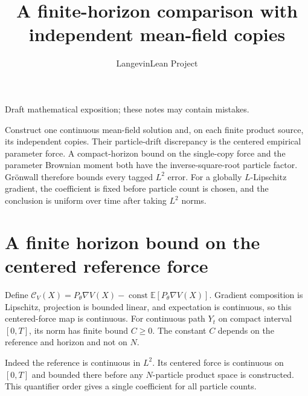 \documentclass[11pt,a4paper]{article}
\title{\texorpdfstring{A finite-horizon comparison with independent mean-field copies}{A finite-horizon comparison with independent mean-field copies}}
\author{LangevinLean Project}
\date{}
\begin{document}
\maketitle
Draft mathematical exposition; these notes may contain mistakes.


Construct one continuous mean-field solution and, on each finite product source, its independent copies. Their particle-drift discrepancy is the centered empirical parameter force. A compact-horizon bound on the single-copy force and the parameter Brownian moment both have the inverse-square-root particle factor. Grönwall therefore bounds every tagged \(L^2\) error. For a globally \(L\)-Lipschitz gradient, the coefficient is fixed before particle count is chosen, and the conclusion is uniform over time after taking \(L^2\) norms.


\section{\texorpdfstring{A finite horizon bound on the centered reference force}{A finite horizon bound on the centered reference force}}


Define \(\mathcal C_V(X)=P_\theta\nabla V(X)-\operatorname{const}\mathbb E[P_\theta\nabla V(X)]\). Gradient composition is Lipschitz, projection is bounded linear, and expectation is continuous, so this centered-force map is continuous. For continuous path \(Y_t\) on compact interval \([0,T]\), its norm has finite bound \(C\ge0\). The constant \(C\) depends on the reference and horizon and not on \(N\).



Indeed the reference is continuous in \(L^2\). Its centered force is continuous on \([0,T]\) and bounded there before any \(N\)-particle product space is constructed. This quantifier order gives a single coefficient for all particle counts.
\end{document}
